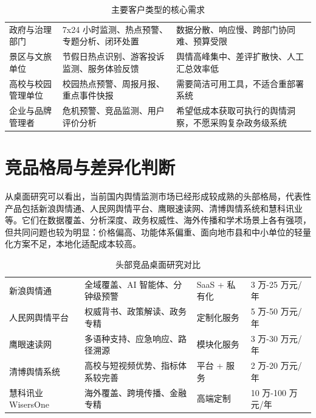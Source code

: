 \begin{table}[htbp]
	\centering
	\caption{主要客户类型的核心需求}
	\begin{tabularx}{\textwidth}{L{2.8cm}YL{3.4cm}}
		\toprule
		 &            &               \\
		\midrule
		政府与治理部门        & 7x24 小时监测、热点预警、专题分析、闭环处置 & 数据分散、响应慢、跨部门协同难、预算受限        \\
		景区与文旅单位        & 节假日热点识别、游客投诉监测、服务体验反馈    & 舆情高峰集中、差评扩散快、人工汇总效率低        \\
		高校与校园管理单位      & 校园热点预警、周报月报、重点事件快报       & 需要简洁可用工具，不适合重部署系统           \\
		企业与品牌管理者       & 危机预警、竞品监测、用户评价分析         & 希望低成本获取可执行的舆情洞察，不愿采购复杂政务级系统 \\
		\bottomrule
	\end{tabularx}
\end{table}

\section{竞品格局与差异化判断}

从桌面研究可以看出，当前国内舆情监测市场已经形成较成熟的头部格局，代表性产品包括新浪舆情通、人民网舆情平台、鹰眼速读网、清博舆情系统和慧科讯业等。它们在数据覆盖、分析深度、政务权威性、海外传播和学术场景上各有强项，但共同问题也较为明显：价格偏高、功能体系偏重、面向地市县和中小单位的轻量化方案不足，本地化适配成本较高。

\begin{table}[htbp]
	\centering
	\caption{头部竞品桌面研究对比}
	\begin{tabularx}{\textwidth}{L{2.7cm}L{3.5cm}L{2.8cm}L{2.5cm}}
		\toprule
		 &     &  &  \\
		\midrule
		新浪舆情通          & 全域覆盖、AI 智能体、分钟级预警 & SaaS + 私有化     & 3 万-25 万元/年    \\
		人民网舆情平台        & 权威背书、政策解读、政务专精    & 定制化服务          & 5 万-50 万元/年    \\
		鹰眼速读网          & 多语种支持、应急响应、路径溯源   & 模块化服务          & 3 万-30 万元/年    \\
		清博舆情系统         & 高校与短视频优势、指标体系较完善  & 平台 + 服务        & 2 万-20 万元/年    \\
		慧科讯业 WisersOne & 海外覆盖、跨境传播、金融专精    & 高端定制           & 10 万-100 万元/年  \\
		\bottomrule
	\end{tabularx}
\end{table}

